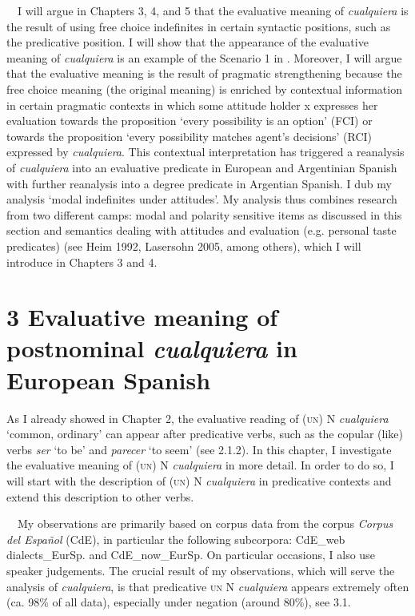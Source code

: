 \begin{styleStandard}
\ \ I will argue in Chapters 3, 4, and 5 that the evaluative meaning of \textit{cualquiera} is the result of using free choice indefinites in certain syntactic positions, such as the predicative position. I will show that the appearance of the evaluative meaning of \textit{cualquiera} is an example of the Scenario 1 in . Moreover, I will argue that the evaluative meaning is the result of pragmatic strengthening because the free choice meaning (the original meaning) is enriched by contextual information in certain pragmatic contexts in which some attitude holder x expresses her evaluation towards the proposition ‘every possibility is an option’ (FCI) or towards the proposition ‘every possibility matches agent’s decisions’ (RCI) expressed by \textit{cualquiera}. This contextual interpretation has triggered a reanalysis of \textit{cualquiera} into an evaluative predicate in European and Argentinian Spanish with further reanalysis into a degree predicate in Argentian Spanish. I dub my analysis ‘modal indefinites under attitudes’. My analysis thus combines research from two different camps: modal and polarity sensitive items as discussed in this section and semantics dealing with attitudes and evaluation (e.g. personal taste predicates) (see Heim 1992, Lasersohn 2005, among others), which I will introduce in Chapters 3 and 4.
\end{styleStandard}

\clearpage\section[3 Evaluative meaning of postnominal cualquiera in European Spanish]{\textbf{3 Evaluative meaning of postnominal }\textbf{\textit{cualquiera }}\textbf{in European Spanish}}
\begin{styleStandard}
As I already showed in Chapter 2, the evaluative reading of (\textsc{un)} N \textit{cualquiera} ‘common, ordinary’ can appear after predicative verbs, such as the copular (like) verbs \textit{ser} ‘to be’ and\textit{ parecer} ‘to seem’ (see 2.1.2). In this chapter, I investigate the evaluative meaning of (\textsc{un)} N\textit{ cualquiera} in more detail. In order to do so, I will start with the description of (\textsc{un)} N \textit{cualquiera} in predicative contexts and extend this description to other verbs.
\end{styleStandard}

\begin{styleStandard}
\ \ My observations are primarily based on corpus data from the corpus \textit{Corpus del Español} (CdE), in particular the following subcorpora: CdE\_web dialects\_EurSp. and CdE\_now\_EurSp. On particular occasions, I also use speaker judgements. The crucial result of my observations, which will serve the analysis of \textit{cualquiera}, is that predicative \textsc{un} N \textit{cualquiera} appears extremely often (ca. 98\% of all data), especially under negation (around 80\%), see 3.1.
\end{styleStandard}

